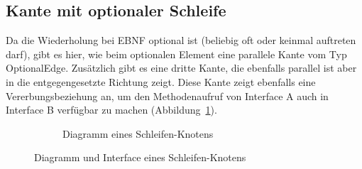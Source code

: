 \documentclass[../InterneDSLs.tex]{subfiles}
\begin{document}
\subsection{Kante mit optionaler Schleife}
Da die Wiederholung bei EBNF optional ist (beliebig oft oder keinmal auftreten darf), gibt es hier, wie beim optionalen Element eine parallele Kante vom Typ OptionalEdge.
Zusätzlich gibt es eine dritte Kante, die ebenfalls parallel ist aber in die entgegengesetzte Richtung zeigt. Diese Kante zeigt ebenfalls eine Vererbungsbeziehung an, um den Methodenaufruf von Interface A auch in Interface B verfügbar zu machen (Abbildung~\ref{FIG:DiagramLoopNode}).
\begin{figure}[ht]
\centering
  \begin{subfigure}[c]{0.49\textwidth}
    \caption{Diagramm eines Schleifen-Knotens}
    \label{FIG:DiagramLoopNode}
  \end{subfigure}
  \begin{subfigure}[c]{0.49\textwidth}
    
  \end{subfigure}
  \caption{Diagramm und Interface eines Schleifen-Knotens}
  \label{FIG:LoopNode}
\end{figure}
\end{document}
